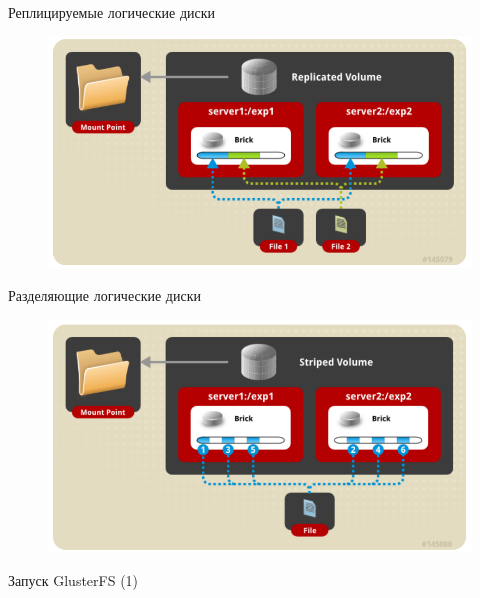 \documentclass{beamer}
\begin{document}
\begin{frame}{Реплицируемые логические диски}
	\begin{figure}[h]
		\centering
		\includegraphics[width=0.8\linewidth]{replicated.png}
	\end{figure}
\end{frame}

\begin{frame}{Разделяющие логические диски}
	\begin{figure}[h]
		\centering
		\includegraphics[width=0.8\linewidth]{striped.png}
	\end{figure}
\end{frame}

\begin{frame}{Запуск GlusterFS (1)}
	\begin{block}{}
		\inputminted{bash}{sc2}
	\end{block}
	\pause
	\begin{block}{}
		\inputminted{bash}{sc1}
	\end{block}
	\pause
	\begin{block}{}
		\inputminted{bash}{sc3}
	\end{block}
\end{frame}
\end{document}
